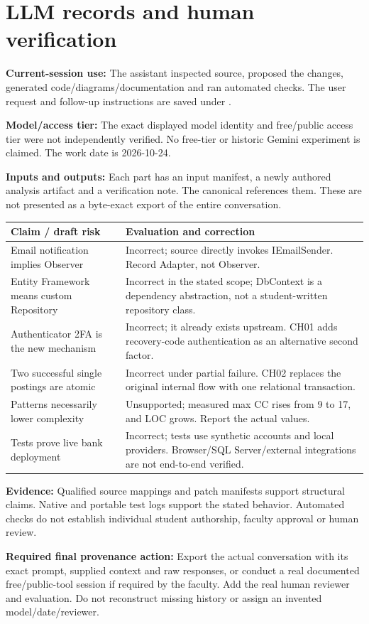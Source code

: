\documentclass[11pt,a4paper]{article}
\newcommand{\entry}[2]{\textbf{#1:} #2\par}
\newcommand{\code}[1]{\texttt{\detokenize{#1}}}
\begin{document}
\section{LLM records and human verification}
\entry{Current-session use}{The assistant inspected source, proposed the changes, generated code/diagrams/documentation and ran automated checks. The user request and follow-up instructions are saved under \code{data/llm/}.}
\entry{Model/access tier}{The exact displayed model identity and free/public access tier were not independently verified. No free-tier or historic Gemini experiment is claimed. The work date is 2026-10-24.}
\entry{Inputs and outputs}{Each part has an input manifest, a newly authored analysis artifact and a verification note. The canonical \code{llm.csv} references them. These are not presented as a byte-exact export of the entire conversation.}
\begin{tabularx}{\linewidth}{@{}p{66mm}L@{}}\toprule
Claim / draft risk & Evaluation and correction\\\midrule
Email notification implies Observer & Incorrect; source directly invokes IEmailSender. Record Adapter, not Observer.\\
Entity Framework means custom Repository & Incorrect in the stated scope; DbContext is a dependency abstraction, not a student-written repository class.\\
Authenticator 2FA is the new mechanism & Incorrect; it already exists upstream. CH01 adds recovery-code authentication as an alternative second factor.\\
Two successful single postings are atomic & Incorrect under partial failure. CH02 replaces the original internal flow with one relational transaction.\\
Patterns necessarily lower complexity & Unsupported; measured max CC rises from 9 to 17, and LOC grows. Report the actual values.\\
Tests prove live bank deployment & Incorrect; tests use synthetic accounts and local providers. Browser/SQL Server/external integrations are not end-to-end verified.\\
\bottomrule\end{tabularx}
\entry{Evidence}{Qualified source mappings and patch manifests support structural claims. Native and portable test logs support the stated behavior. Automated checks do not establish individual student authorship, faculty approval or human review.}
\entry{Required final provenance action}{Export the actual conversation with its exact prompt, supplied context and raw responses, or conduct a real documented free/public-tool session if required by the faculty. Add the real human reviewer and evaluation. Do not reconstruct missing history or assign an invented model/date/reviewer.}
\clearpage
\end{document}
